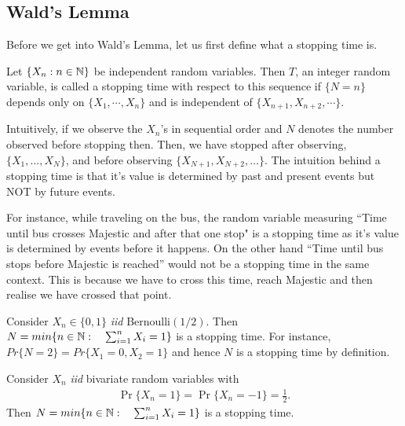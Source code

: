 \documentclass[a4paper,10pt, english]{article}
\begin{document}
\subsection{Wald's Lemma}
Before we get into Wald's Lemma, let us first define what a stopping time is.
\begin{defn}
	Let $\{X_n: n\in \mathbb{N}\}$ be independent random variables. Then $T$, an integer random variable, is called a stopping time with respect to this sequence if $\{N=n\}$ depends only on $\{X_1,\cdots,X_n\}$ and is independent of $\{X_{n+1}, X_{n+2},\cdots\}$. 
\end{defn}
Intuitively, if we observe the $X_n$'s in sequential order and $N$ denotes the number observed before stopping then. Then, we have stopped after observing, $\{X_1, \ldots, X_N\}$, and before observing $\{X_{N+1}, X_{N+2}, \ldots\}$. 
The intuition behind a stopping time is that it's value is determined by past and present events but NOT by future events. 
\begin{exmp}
	For instance, while traveling on the bus, the random variable measuring ``Time until bus crosses Majestic and after that one stop" is a stopping time as it's value is determined by events before it happens. On the other hand ``Time until bus stops before Majestic is reached'' would not be a stopping time  in the same context. This is because we have to cross this time, reach Majestic and then realise we have crossed that point. 
\end{exmp}
\begin{exmp} Consider $X_n \in \{0,1\}$ \emph{iid} Bernoulli$(1/2)$. Then $N = min \{n \in \mathbb{N}:\quad \sum_{i=1}^n X_i = 1\}$ is a stopping time. For instance, $Pr\{N=2\} = Pr\{X_1=0,X_2=1\}$ and hence $ N $ is a stopping time by definition.
\end{exmp}
\begin{exmp} Consider $X_n$ \emph{iid} bivariate random variables with 
	\begin{align*}
	\Pr\{X_n = 1\} = \Pr\{X_n = -1\} = \frac{1}{2}. 
	\end{align*}
	Then $N = min \{n \in \mathbb{N}:\quad \sum_{i=1}^n X_i = 1\}$ is a stopping time.
\end{exmp}
\end{document}
